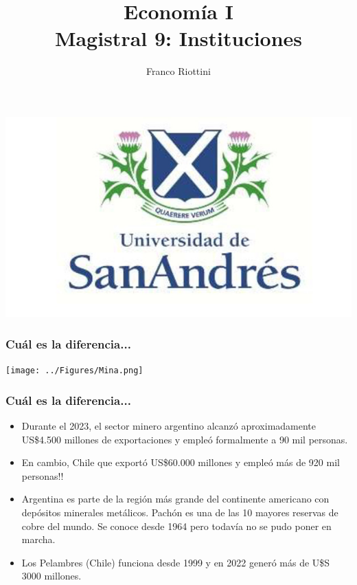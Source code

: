 \documentclass{beamer}
\title[Economía I]{Economía I \vspace{4mm}
\\ Magistral 9: Instituciones}
\date{}
\author[Franco Riottini]{Franco Riottini}
\institute[]{Universidad de San Andrés}
\begin{document}
\begin{frame}
\titlepage
\centering
\includegraphics[scale=0.2]{../Figures/logoUDESA.jpg} 
\end{frame}


\begin{frame}
\frametitle{Cuál es la diferencia...}
\centering
\texttt{[image: ../Figures/Mina.png]}
\end{frame}

\begin{frame}
\frametitle{Cuál es la diferencia...}
\begin{itemize}
    \item Durante el 2023, el sector minero argentino alcanzó aproximadamente US\$4.500 millones de exportaciones y empleó formalmente a 90 mil personas.
    \item En cambio, Chile que exportó US\$60.000 millones y empleó más de 920 mil personas!!
    \item Argentina es parte de la región más grande del continente americano con depósitos minerales metálicos. Pachón es una de las 10 mayores reservas de cobre del mundo. Se conoce desde 1964 pero todavía no se pudo poner en marcha.
    \item Los Pelambres (Chile) funciona desde 1999 y en 2022 generó más de U\$S 3000 millones.
\end{itemize}
\end{frame}
\end{document}
